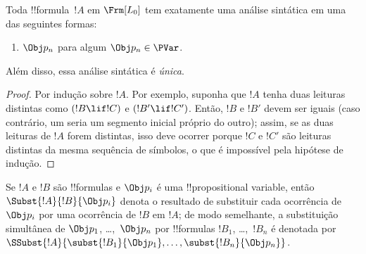 \documentclass[../../../include/open-logic-section]{subfiles}
\begin{document}
\begin{prop}
Toda !!{formula}~$!A$ em $ \Frm[L_0]$ tem exatamente uma análise sintática em uma das
seguintes formas:
\begin{enumerate}


\item $\Obj p_n$ para algum $\Obj p_n \in  \PVar$.
  




\end{enumerate}
Além disso, essa análise sintática é \emph{única}.
\end{prop}

\begin{proof}
Por indução sobre $!A$. Por exemplo, suponha que $!A$ tenha duas
leituras distintas como $(!B \lif !C)$ e $(!B' \lif !C')$. Então, $!B$ e $!B'$
devem ser iguais (caso contrário, um seria um segmento inicial próprio do
outro); assim, se as duas leituras de $!A$ forem distintas, isso deve ocorrer porque
$!C$ e $!C'$ são leituras distintas da mesma sequência de símbolos,
o que é impossível pela hipótese de indução.
\end{proof}


\begin{defn}
Se $!A$ e $!B$ são !!{formula}s e $\Obj p_i$ é uma !!{propositional
variable}, então $\Subst{!A}{!B}{\Obj p_i}$ denota o resultado de
substituir cada ocorrência de $\Obj p_i$ por uma ocorrência de $!B$ em $!A$;
de modo semelhante, a substituição simultânea de $\Obj p_1$, \dots,~$\Obj p_n$ por
!!{formula}s $!B_1$, \dots,~$!B_n$ é denotada por
$\SSubst{!A}{\subst{!B_1}{\Obj p_1},\dots,\subst{!B_n}{\Obj p_n}}$.
\end{defn}
\end{document}
